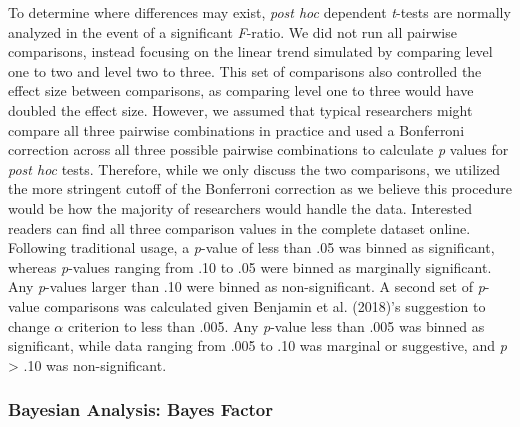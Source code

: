 \documentclass[,man, mask]{apa6}
\theoremstyle{definition}
\theoremstyle{definition}
\theoremstyle{definition}
\theoremstyle{remark}
\begin{document}
To determine where differences may exist, \emph{post hoc} dependent
\emph{t}-tests are normally analyzed in the event of a significant
\emph{F}-ratio. We did not run all pairwise comparisons, instead
focusing on the linear trend simulated by comparing level one to two and
level two to three. This set of comparisons also controlled the effect
size between comparisons, as comparing level one to three would have
doubled the effect size. However, we assumed that typical researchers
might compare all three pairwise combinations in practice and used a
Bonferroni correction across all three possible pairwise combinations to
calculate \emph{p} values for \emph{post hoc} tests. Therefore, while we
only discuss the two comparisons, we utilized the more stringent cutoff
of the Bonferroni correction as we believe this procedure would be how
the majority of researchers would handle the data. Interested readers
can find all three comparison values in the complete dataset online.
Following traditional usage, a \emph{p}-value of less than .05 was
binned as significant, whereas \emph{p}-values ranging from .10 to .05
were binned as marginally significant. Any \emph{p}-values larger than
.10 were binned as non-significant. A second set of \emph{p}-value
comparisons was calculated given Benjamin et al. (2018)'s suggestion to
change \(\alpha\) criterion to less than .005. Any \emph{p}-value less
than .005 was binned as significant, while data ranging from .005 to .10
was marginal or suggestive, and \emph{p} \textgreater{} .10 was
non-significant.

\subsubsection{Bayesian Analysis: Bayes
Factor}\label{bayesian-analysis-bayes-factor}
\end{document}
